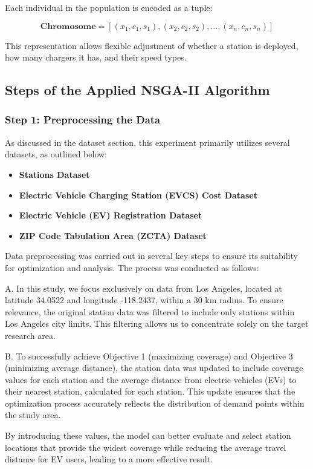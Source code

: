 Each individual in the population is encoded as a tuple:

\[
\textbf{Chromosome} = \left[ (x_1, c_1, s_1), (x_2, c_2, s_2), ..., (x_n, c_n, s_n) \right]
\]

This representation allows flexible adjustment of whether a station is deployed, how many chargers it has, and their speed types.

\subsection{Steps of the Applied NSGA-II Algorithm}
\subsubsection*{Step 1: Preprocessing the Data}

As discussed in the dataset section, this experiment primarily utilizes several datasets, as outlined below:
\begin{itemize}
    \item \textbf{Stations Dataset}
    \item \textbf{Electric Vehicle Charging Station (EVCS) Cost Dataset}
    \item \textbf{Electric Vehicle (EV) Registration Dataset}
    \item \textbf{ZIP Code Tabulation Area (ZCTA) Dataset}
\end{itemize}

Data preprocessing was carried out in several key steps to ensure its suitability for optimization and analysis. The process was conducted as follows:



A. In this study, we focus exclusively on data from Los Angeles, located at latitude 34.0522 and longitude -118.2437, within a 30 km radius. To ensure relevance, the original station data was filtered to include only stations within Los Angeles city limits. This filtering allows us to concentrate solely on the target research area.

B. To successfully achieve Objective 1 (maximizing coverage) and Objective 3 (minimizing average distance), the station data was updated to include coverage values for each station and the average distance from electric vehicles (EVs) to their nearest station, calculated for each station. This update ensures that the optimization process accurately reflects the distribution of demand points within the study area.

By introducing these values, the model can better evaluate and select station locations that provide the widest coverage while reducing the average travel distance for EV users, leading to a more effective result.


